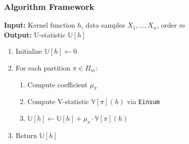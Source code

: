 \documentclass[9pt]{beamer}
\theoremstyle{mystyle}
\theoremstyle{mystyletwo}
\newcommand{\libref}[2]{\href{#2}{\texttt{#1}}}
\newcommand{\ustat}{\mathbb{U}}
\newcommand{\vstat}{\mathbb{V}}
\newcommand{\partition}{\Pi}
\newcommand{\partitionp}[1]{\partition_{#1}}
\def\package{\libref{u-stats}{https://github.com/Amedar-Asterisk/U-Statistics-python}}
\begin{document}
\begin{frame}
\frametitle{Algorithm Framework }

\begin{center}
\begin{minipage}{1.0\textwidth}

\begin{tcolorbox}[colback=white,colframe=blue!50!black,title=Basic Algorithm Framework]
\begin{flushleft}
\textbf{Input:} Kernel function $h$, data samples $X_1,\ldots,X_n$, order $m$ \\
\textbf{Output:} U-statistic $\ustat[h]$
\end{flushleft}

\vspace{0.2cm}
\begin{enumerate}
    \item Initialize $\ustat[h] \gets 0$
    \item For each partition $\pi \in \partitionp{m}$:
    \begin{enumerate}
        \item Compute coefficient $\mu_{\pi}$
        \item Compute V-statistic $\vstat[\pi](h)$ via \texttt{Einsum}
        \item $\ustat[h] \gets \ustat[h] + \mu_{\pi} \cdot \vstat[\pi](h)$
    \end{enumerate}
    \item Return $\ustat[h]$
\end{enumerate}
\end{tcolorbox}


\end{minipage}
\end{center}

\end{frame}


\end{document}

